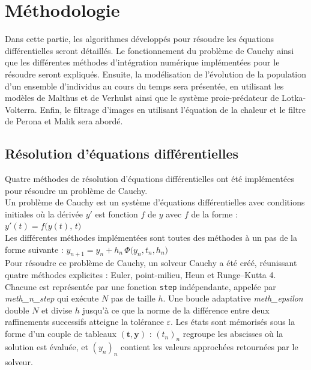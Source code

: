 \documentclass{article}
\begin{document}
\section{Méthodologie}
Dans cette partie, les algorithmes développés pour résoudre les équations différentielles seront détaillés. 
Le fonctionnement du problème de Cauchy ainsi que les différentes méthodes d'intégration numérique implémentées pour le résoudre seront expliqués. 
Ensuite, la modélisation de l'évolution de la population d'un ensemble d'individus au cours du temps sera présentée, en utilisant les modèles de Malthus et de Verhulst ainsi que le système proie-prédateur de Lotka-Volterra.
Enfin, le filtrage d'images en utilisant l'équation de la chaleur et le filtre de Perona et Malik sera abordé.

\subsection{Résolution d'équations différentielles}
Quatre méthodes de résolution d'équations différentielles ont été implémentées pour résoudre un problème de Cauchy.\\
Un problème de Cauchy est un système d'équations différentielles avec conditions initiales où la dérivée \(y'\) est fonction \(f\) de \(y\) avec \(f\) de la forme : \( y'(t) = f\bigl(y(t),\,t\bigr) \)\\
Les différentes méthodes implémentées sont toutes des méthodes à un pas de la forme suivante : \( y_{n+1} = y_n + h_n \,\Phi\bigl(y_n, t_n, h_n\bigr) \)\\ 
Pour résoudre ce problème de Cauchy, un solveur Cauchy a été créé, réunissant quatre méthodes explicites : Euler, point-milieu, Heun et Runge–Kutta 4. Chacune est représentée par une fonction \texttt{step} indépendante, appelée par \textit{meth\_n\_step} qui exécute \(N\) pas de taille \(h\). Une boucle adaptative \textit{meth\_epsilon} double \(N\) et divise \(h\) jusqu’à ce que la norme de la différence entre deux raffinements successifs atteigne la tolérance \(\varepsilon\).  
Les états sont mémorisés sous la forme d’un couple de tableaux \((\mathbf t,\mathbf y)\) : \((t_n)_n\) regroupe les abscisses où la solution est évaluée, et \((y_n)_n\) contient les valeurs approchées retournées par le solveur.\\ \\
\end{document}

